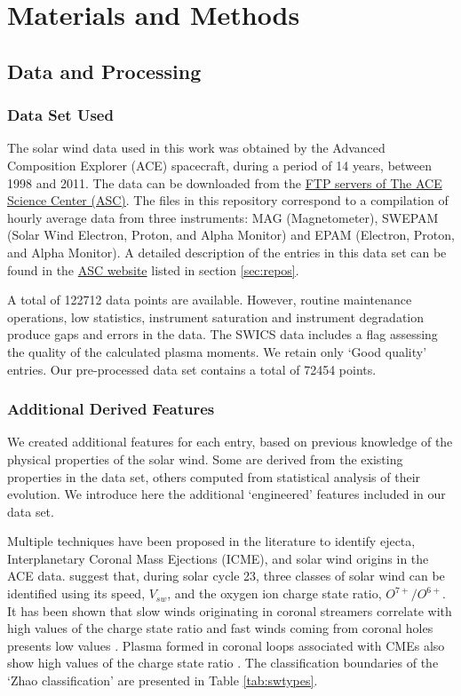 \documentclass[utf8]{frontiersSCNS} %
\begin{document}
\section{Materials and Methods}

\subsection{Data and Processing}
\label{sec:dataprocessing}
\subsubsection{Data Set Used}
The solar wind data used in this work was obtained by the Advanced Composition Explorer (ACE) spacecraft, during a period of 14 years, between 1998 and 2011. The data can be downloaded from the \href{ftp://mussel.srl.caltech.edu/pub/ace/level2/multi}{FTP servers of The ACE Science Center (ASC)}. The files in this repository correspond to a compilation of hourly average data from three instruments: MAG (Magnetometer), SWEPAM (Solar Wind Electron, Proton, and Alpha Monitor) and EPAM (Electron, Proton, and Alpha Monitor). A detailed description of the entries in this data set can be found in the \href{http://www.srl.caltech.edu/cgi-bin/dib/rundibviewmultil2/ACE/ASC/DATA/level2/multi}{ASC website} listed in section \ref{sec:repos}.

A total of 122712 data points are available. However, routine maintenance operations, low statistics, instrument saturation and instrument degradation produce gaps and errors in the data. The SWICS data includes a flag assessing the quality of the calculated plasma moments. We retain only `Good quality' entries. Our pre-processed data set contains a total of 72454 points.

\subsubsection{Additional Derived Features}
We created additional features for each entry, based on previous knowledge of the physical properties of the solar wind. Some are derived from the existing properties in the data set, others computed from statistical analysis of their evolution. We introduce here the additional `engineered' features included in our data set.

Multiple techniques have been proposed in the literature to identify ejecta, Interplanetary Coronal Mass Ejections (ICME), and solar wind origins in the ACE data. \citep{Zhao2009} suggest that, during solar cycle 23, three classes of solar wind can be identified using its speed, $V_{sw}$, and the oxygen ion charge state ratio, $O^{7+}/O^{6+}$. It has been shown that slow winds originating in coronal streamers correlate with high values of the charge state ratio and fast winds coming from coronal holes presents low values \citep{DAmicis2015}. Plasma formed in coronal loops associated with CMEs also show high values of the charge state ratio \citep{Xu2015b}. The classification boundaries of the `Zhao classification' are presented in Table \ref{tab:swtypes}.
\end{document}
